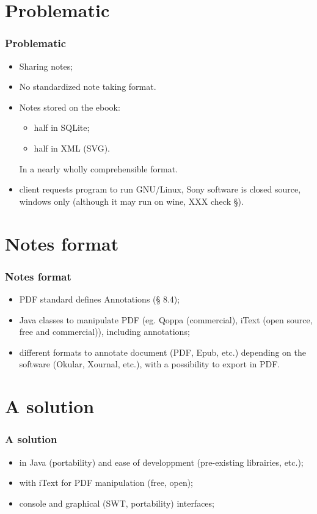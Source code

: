 \documentclass[t,12pt]{beamer}
\begin{document}
\section{Problematic}
\begin{frame}
  \frametitle{Problematic}
  \begin{itemize}
  \pause \item Sharing notes;
  \pause \item No standardized note taking format.
  \pause \item Notes stored  on the ebook:
    \begin{itemize}
      \item half in SQLite;
      \item half in XML (SVG).
    \end{itemize}
  \pause In a nearly wholly comprehensible format.
  \pause \item client requests program to run GNU/Linux,
  \pause Sony software is closed source, windows only (although
  it may run on wine, XXX check §).
  \end{itemize}
\end{frame}

\section{Notes format}
\begin{frame}
  \frametitle{Notes format}
  \begin{itemize}
    \item PDF standard defines Annotations (§ 8.4);
    \pause \item Java classes to manipulate PDF (eg. Qoppa (commercial),
      iText (open source, free and commercial)), including annotations;
    \pause \item different formats to annotate document (PDF, Epub, etc.)
      depending on the software (Okular, Xournal, etc.), with a possibility to
      export in PDF.
  \end{itemize}
\end{frame}

\section{A solution}
\begin{frame}
  \frametitle{A solution}
  \begin{itemize}
    \item in Java (portability) and ease of developpment (pre-existing
      librairies, etc.);
    \pause \item with iText for PDF manipulation (free, open);
    \pause \item console and graphical (SWT, portability) interfaces;
  \end{itemize}
\end{frame}
\end{document}
